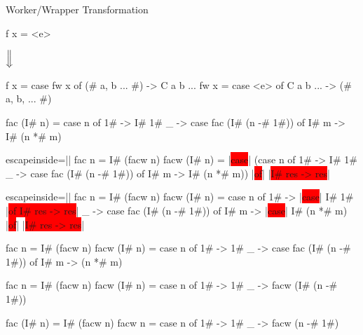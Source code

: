 \documentclass{haskellbeamer}
\begin{document}
\begin{frame}[fragile]{Worker/Wrapper Transformation}
  \begin{center}
    \begin{minipage}{0.7\textwidth}
      \begin{overprint}
        \begin{haskell}
          f x = <e>
        \end{haskell}
        \hspace{0.1\textwidth}$\Big\Downarrow$
        \begin{haskell}
          f x = case fw x of
            (# a, b ... #) -> C a b ...
          fw x = case <e> of
            C a b ... -> (# a, b, ... #)
        \end{haskell}
        \begin{haskell}
          fac (I# n) = case n of
            1# -> I# 1#
            _  -> case fac (I# (n -# 1#)) of
              I# m -> I# (n *# m)
        \end{haskell}
        \begin{haskell*}{escapeinside=||}
          fac n = I# (facw n)
          facw (I# n) = |\colorbox{red}{case}| (case n of
            1# -> I# 1#
            _  -> case fac (I# (n -# 1#)) of
              I# m -> I# (n *# m)) |\colorbox{red}{of}|
            |\colorbox{red}{I# res -> res}|
        \end{haskell*}
        \begin{haskell*}{escapeinside=||}
          fac n = I# (facw n)
          facw (I# n) = case n of
            1# ->
              |\colorbox{red}{case}| I# 1# |\colorbox{red}{of I# res -> res}|
            _  -> case fac (I# (n -# 1#)) of
              I# m ->  |\colorbox{red}{case}| I# (n *# m) |\colorbox{red}{of}|
                |\colorbox{red}{I# res -> res}|
        \end{haskell*}
        \begin{haskell}
          fac n = I# (facw n)
          facw (I# n) = case n of
            1# -> 1#
            _  -> case fac (I# (n -# 1#)) of
              I# m -> (n *# m)
        \end{haskell}
        \begin{haskell}
          fac n = I# (facw n)
          facw (I# n) = case n of
            1# -> 1#
            _  -> facw (I# (n -# 1#))
        \end{haskell}
        \begin{haskell}
          fac (I# n) = I# (facw n)
          facw n = case n of
            1# -> 1#
            _  -> facw (n -# 1#)
        \end{haskell}
      \end{overprint}
    \end{minipage}
  \end{center}
\end{frame}
\end{document}
